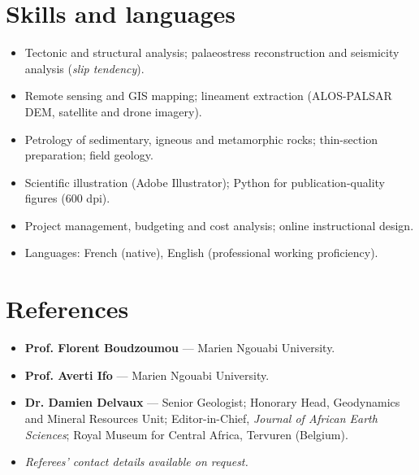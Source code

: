 \documentclass[11pt,a4paper]{article}
\begin{document}
\section{Skills and languages}
\begin{itemize}
\item Tectonic and structural analysis; palaeostress reconstruction and seismicity analysis (\textit{slip tendency}).
\item Remote sensing and GIS mapping; lineament extraction (ALOS-PALSAR DEM, satellite and drone imagery).
\item Petrology of sedimentary, igneous and metamorphic rocks; thin-section preparation; field geology.
\item Scientific illustration (Adobe Illustrator); Python for publication-quality figures (600 dpi).
\item Project management, budgeting and cost analysis; online instructional design.
\item Languages: French (native), English (professional working proficiency).
\end{itemize}

\section{References}
\begin{itemize}
\item \textbf{Prof. Florent Boudzoumou} — Marien Ngouabi University.
\item \textbf{Prof. Averti Ifo} — Marien Ngouabi University.
\item \textbf{Dr. Damien Delvaux} — Senior Geologist; Honorary Head, Geodynamics and Mineral Resources Unit; Editor-in-Chief, \textit{Journal of African Earth Sciences}; Royal Museum for Central Africa, Tervuren (Belgium).
\item \textit{Referees' contact details available on request.}
\end{itemize}
\end{document}
